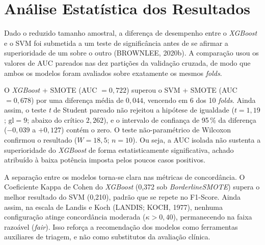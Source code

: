 \section{Análise Estatística dos Resultados}
\label{sec:analise_estatistica}

Dado o reduzido tamanho amostral, a diferença de desempenho entre o
\textit{XGBoost} e o SVM foi submetida a um teste de significância antes de se
afirmar a superioridade de um sobre o outro (BROWNLEE, 2020b). A comparação
usou os valores de AUC pareados nas dez partições da validação cruzada, de
modo que ambos os modelos foram avaliados sobre exatamente os mesmos
\textit{folds}.

O \textit{XGBoost} + SMOTE (AUC $= 0,722$) superou o SVM + SMOTE
(AUC $= 0,678$) por uma diferença média de $0,044$, vencendo em 6 dos 10
\textit{folds}. Ainda assim, o teste \textit{t} de Student pareado não rejeitou
a hipótese de igualdade ($t = 1,19$; $\text{gl} = 9$; abaixo do crítico
$2,262$), e o intervalo de confiança de 95\,\% da diferença ($-0,039$ a
$+0,127$) contém o zero. O teste não-paramétrico de Wilcoxon confirmou o
resultado ($W = 18,5$; $n = 10$). Ou seja, a AUC isolada não sustenta a
superioridade do \textit{XGBoost} de forma estatisticamente significativa,
achado atribuído à baixa potência imposta pelos poucos casos positivos.

A separação entre os modelos torna-se clara nas métricas de concordância. O
Coeficiente Kappa de Cohen do \textit{XGBoost} (0,372 sob \textit{BorderlineSMOTE})
supera o melhor resultado do SVM (0,210), padrão que se repete no F1-Score.
Ainda assim, na escala de Landis e Koch (LANDIS; KOCH, 1977), nenhuma
configuração atinge concordância moderada ($\kappa > 0,40$), permanecendo na
faixa razoável (\textit{fair}). Isso reforça a recomendação dos modelos como
ferramentas auxiliares de triagem, e não como substitutos da avaliação clínica.
